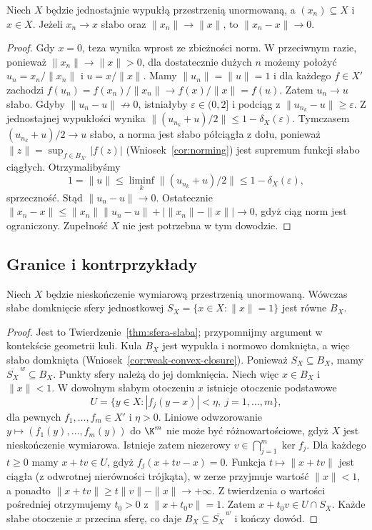 \begin{twierdzenie}
\label{thm:radon-riesz26}
Niech $X$ będzie jednostajnie wypukłą przestrzenią unormowaną,
a $(x_n)\subseteq X$ i $x\in X$. Jeżeli $x_n\to x$
słabo oraz $\|x_n\|\to\|x\|$, to $\|x_n-x\|\to0$.
\end{twierdzenie}
\begin{proof}
Gdy $x=0$, teza wynika wprost ze zbieżności norm.
W przeciwnym razie, ponieważ $\|x_n\|\to\|x\|>0$,
dla dostatecznie dużych $n$ możemy położyć
$u_n=x_n/\|x_n\|$ i $u=x/\|x\|$.
Mamy $\|u_n\|=\|u\|=1$ i dla każdego $f\in X'$
zachodzi $f(u_n)=f(x_n)/\|x_n\|\to f(x)/\|x\|=f(u)$.
Zatem $u_n\to u$ słabo.
Gdyby $\|u_n-u\|\not\to0$, istniałyby
$\varepsilon\in(0,2]$ i podciąg z $\|u_{n_k}-u\|\ge\varepsilon$.
Z jednostajnej wypukłości wynika
$\|(u_{n_k}+u)/2\|\le1-\delta_X(\varepsilon)$.
Tymczasem $(u_{n_k}+u)/2\to u$ słabo, a norma jest
słabo półciągła z dołu, ponieważ
$\|z\|=\sup_{f\in B_{X'}}|f(z)|$
(Wniosek~\ref{cor:norming}) jest supremum
funkcji słabo ciągłych. Otrzymalibyśmy
\[
 1=\|u\|\le\liminf_k\|(u_{n_k}+u)/2\|
 \le1-\delta_X(\varepsilon),
\]
sprzeczność. Stąd $\|u_n-u\|\to0$.
Ostatecznie
$\|x_n-x\|\le\|x_n\|\|u_n-u\|
+|\|x_n\|-\|x\||\to0$, gdyż ciąg norm jest ograniczony.
Zupełność $X$ nie jest potrzebna w tym dowodzie.
\end{proof}

\subsection{Granice i kontrprzykłady}

\begin{twierdzenie}
\label{thm:sphere-weak-dense26}
Niech $X$ będzie nieskończenie wymiarową przestrzenią
unormowaną. Wówczas słabe domknięcie sfery jednostkowej
$S_X=\{x\in X:\|x\|=1\}$ jest równe $B_X$.
\end{twierdzenie}
\begin{proof}
Jest to Twierdzenie~\ref{thm:sfera-slaba}; przypomnijmy
argument w kontekście geometrii kuli.
Kula $B_X$ jest wypukła i normowo domknięta,
a więc słabo domknięta
(Wniosek~\ref{cor:weak-convex-closure}).
Ponieważ $S_X\subseteq B_X$, mamy
$\overline{S_X}^{\,w}\subseteq B_X$.
Punkty sfery należą do jej domknięcia.
Niech więc $x\in B_X$ i $\|x\|<1$.
W dowolnym słabym otoczeniu $x$ istnieje
otoczenie podstawowe
\[
 U=\{y\in X:|f_j(y-x)|<\eta,\ j=1,\ldots,m\},
\]
dla pewnych $f_1,\ldots,f_m\in X'$ i $\eta>0$.
Liniowe odwzorowanie $y\mapsto(f_1(y),\ldots,f_m(y))$
do $\K^m$ nie może być różnowartościowe, gdyż
$X$ jest nieskończenie wymiarowa. Istnieje zatem
niezerowy $v\in\bigcap_{j=1}^m\ker f_j$.
Dla każdego $t\ge0$ mamy $x+tv\in U$, gdyż
$f_j(x+tv-x)=0$.
Funkcja $t\mapsto\|x+tv\|$ jest ciągła
(z odwrotnej nierówności trójkąta), w zerze
przyjmuje wartość $\|x\|<1$, a ponadto
$\|x+tv\|\ge t\|v\|-\|x\|\to+\infty$.
Z twierdzenia o wartości pośredniej otrzymujemy
$t_0>0$ z $\|x+t_0v\|=1$.
Zatem $x+t_0v\in U\cap S_X$.
Każde słabe otoczenie $x$ przecina sferę,
co daje $B_X\subseteq\overline{S_X}^{\,w}$
i kończy dowód.
\end{proof}

